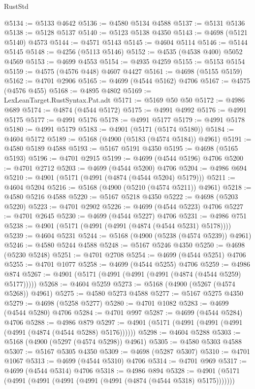 \begin{lexlean}{RustStd}
\begin{coremodule}
@5134 := @5133 @4642
@5136 := @4580 @5134 @4588
@5137 := @5131 @5136
@5138 := @5128 @5137
@5140 := @5123 @5138 @4350
@5143 := @4698 (@5121 @5140) @4573
@5144 := @4571 @5143
@5145 := @4604 @5114
@5146 := @5144 @5145
@5148 := @4256 (@5113 @5146)
@5152 := @4535 (@4538 @400) @5052 @4569
@5153 := @4699 @4553
@5154 := @4935 @4259
@5155 := @5153 @5154
@5159 := @4575 (@4576 @448) @4607 @4427
@5161 := @4698 (@5155 @5159)
@5162 := @4701 @2906
@5165 := @4699 (@4544 @5162) @4706
@5167 := @4575 (@4576 @455)
@5168 := @4895 @4802
@5169 := LexLeanTarget.RustSyntax.Pat.adt
@5171 := @5169 @50 @50
@5172 := @4986 @689
@5174 := @4874 (@4544 @5172)
@5175 := @4991 @4992
@5176 := @4991 @5175
@5177 := @4991 @5176
@5178 := @4991 @5177
@5179 := @4991 @5178
@5180 := @4991 @5179
@5183 := @4901 (@5171 (@5174 @5180))
@5184 := @4604 @5172
@5189 := @5168 (@4900 (@5183 (@4574 @5184)) @4961)
@5191 := @4580 @5189 @4588
@5193 := @5167 @5191 @4350
@5195 := @4698 (@5165 @5193)
@5196 := @4701 @2915
@5199 := @4699 (@4544 @5196) @4706
@5200 := @4701 @2712
@5203 := @4699 (@4544 @5200) @4706
@5204 := @4986 @694
@5210 := @4901 (@5171 (@4991 (@4874 (@4544 @5204) @5179)))
@5211 := @4604 @5204
@5216 := @5168 (@4900 (@5210 (@4574 @5211)) @4961)
@5218 := @4580 @5216 @4588
@5220 := @5167 @5218 @4350
@5222 := @4698 (@5203 @5220)
@5223 := @4701 @2902
@5226 := @4699 (@4544 @5223) @4706
@5227 := @4701 @2645
@5230 := @4699 (@4544 @5227) @4706
@5231 := @4986 @751
@5238 := @4901 (@5171 (@4991 (@4991 (@4874 (@4544 @5231) @5178))))
@5239 := @4604 @5231
@5244 := @5168 (@4900 (@5238 (@4574 @5239)) @4961)
@5246 := @4580 @5244 @4588
@5248 := @5167 @5246 @4350
@5250 := @4698 (@5230 @5248)
@5251 := @4701 @2708
@5254 := @4699 (@4544 @5251) @4706
@5255 := @4701 @1077
@5258 := @4699 (@4544 @5255) @4706
@5259 := @4986 @874
@5267 := @4901 (@5171 (@4991 (@4991 (@4991 (@4874 (@4544 @5259) @5177)))))
@5268 := @4604 @5259
@5273 := @5168 (@4900 (@5267 (@4574 @5268)) @4961)
@5275 := @4580 @5273 @4588
@5277 := @5167 @5275 @4350
@5279 := @4698 (@5258 @5277)
@5280 := @4701 @1082
@5283 := @4699 (@4544 @5280) @4706
@5284 := @4701 @997
@5287 := @4699 (@4544 @5284) @4706
@5288 := @4986 @879
@5297 := @4901 (@5171 (@4991 (@4991 (@4991 (@4991 (@4874 (@4544 @5288) @5176))))))
@5298 := @4604 @5288
@5303 := @5168 (@4900 (@5297 (@4574 @5298)) @4961)
@5305 := @4580 @5303 @4588
@5307 := @5167 @5305 @4350
@5309 := @4698 (@5287 @5307)
@5310 := @4701 @1067
@5313 := @4699 (@4544 @5310) @4706
@5314 := @4701 @969
@5317 := @4699 (@4544 @5314) @4706
@5318 := @4986 @894
@5328 := @4901 (@5171 (@4991 (@4991 (@4991 (@4991 (@4991 (@4874 (@4544 @5318) @5175)))))))

\end{coremodule}
\end{lexlean}
